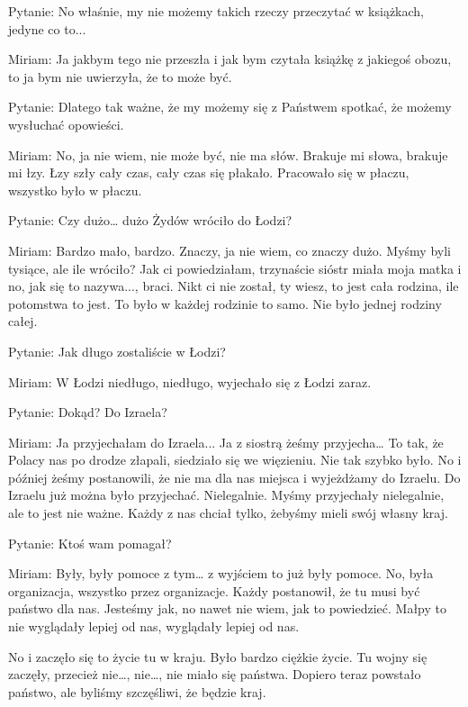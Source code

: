  

Pytanie: No właśnie, my nie możemy takich rzeczy przeczytać w książkach, jedyne co to... 

Miriam: Ja jakbym tego nie przeszła i jak bym czytała książkę z jakiegoś obozu, to ja bym nie uwierzyła, że to może być. 

Pytanie: Dlatego tak ważne, że my możemy się z Państwem spotkać, że możemy wysłuchać opowieści. 

Miriam: No, ja nie wiem, nie może być, nie ma słów. Brakuje mi słowa, brakuje mi łzy. Łzy szły cały czas, cały czas się płakało. Pracowało się w płaczu, wszystko było w płaczu. 

 

Pytanie: Czy dużo… dużo Żydów wróciło do Łodzi? 

Miriam: Bardzo mało, bardzo. Znaczy, ja nie wiem, co znaczy dużo. Myśmy byli tysiące, ale ile wróciło? Jak ci powiedziałam, trzynaście sióstr miała moja matka i no, jak się to nazywa..., braci. Nikt ci nie został, ty wiesz, to jest cała rodzina, ile potomstwa to jest. To było w każdej rodzinie to samo. Nie było jednej rodziny całej. 

 

Pytanie: Jak długo zostaliście w Łodzi? 

Miriam: W Łodzi niedługo, niedługo, wyjechało się z Łodzi zaraz. 

Pytanie: Dokąd? Do Izraela? 

Miriam: Ja przyjechałam do Izraela... Ja z siostrą żeśmy przyjecha… To tak, że Polacy nas po drodze złapali, siedziało się we więzieniu. Nie tak szybko było. No i później żeśmy postanowili, że nie ma dla nas miejsca i wyjeżdżamy do Izraelu. Do Izraelu już można było przyjechać. Nielegalnie. Myśmy przyjechały nielegalnie, ale to jest nie ważne. Każdy z nas chciał tylko, żebyśmy mieli swój własny kraj. 

 

Pytanie: Ktoś wam pomagał? 

Miriam: Były, były pomoce z tym… z wyjściem to już były pomoce. No, była organizacja, wszystko przez organizacje. Każdy postanowił, że tu musi być państwo dla nas. Jesteśmy jak, no nawet nie wiem, jak to powiedzieć. Małpy to nie wyglądały lepiej od nas, wyglądały lepiej od nas. 

No i zaczęło się to życie tu w kraju. Było bardzo ciężkie życie. Tu wojny się zaczęły, przecież nie…, nie…, nie miało się państwa. Dopiero teraz powstało państwo, ale byliśmy szczęśliwi, że będzie kraj. 

